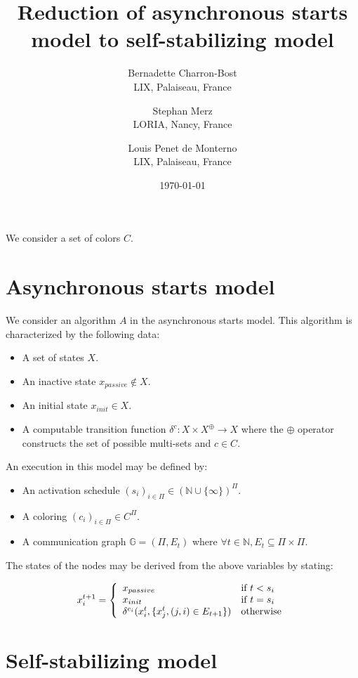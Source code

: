 \documentclass[11pt,letterpaper]{article}
\title{Reduction of asynchronous starts model to self-stabilizing model}
\author{
	Bernadette Charron-Bost \\
	LIX, Palaiseau, France
\and
	Stephan Merz \\
	LORIA, Nancy, France
\and
	Louis Penet de Monterno \\
	LIX, Palaiseau, France
}
\date{\today}
\begin{document}
  \maketitle

We consider a set of colors $C$.

\section{Asynchronous starts model}

We consider an algorithm $A$ in the asynchronous starts model.
This algorithm is characterized by the following data:

\begin{itemize}
	\item A set of states $X$.
	\item An inactive state $x_{passive} \notin X$.
	\item An initial state $x_{init} \in X$.
	\item A computable transition function $\delta^c : X \times X^\oplus \rightarrow X$ where the $\oplus$ operator constructs the set of possible multi-sets and $c \in C$.
\end{itemize}

\noindent An execution in this model may be defined by:
\begin{itemize}
	\item An activation schedule $(s_i)_{i \in \Pi} \in (\mathds{N} \cup \{\infty\})^\Pi$.
	\item A coloring $(c_i)_{i \in \Pi} \in C^\Pi$.
	\item A communication graph $\mathds{G} = (\Pi, E_t)$ where $\forall t \in \mathds{N}, E_t \subseteq \Pi \times \Pi$.
\end{itemize}

\noindent The states of the nodes may be derived from the above variables by stating:

$$x_i^{t+1} = \left \{ \begin{array}{l l} x_{passive} & \mbox{if}~t < s_i \\
	x_{init} & \mbox{if}~t = s_i \\
\delta^{c_i}(x_i^t, \{x_j^t, (j,i) \in E_{t+1}\}) & \mbox{otherwise} \end{array} \right.$$

\section{Self-stabilizing model}
\end{document}
